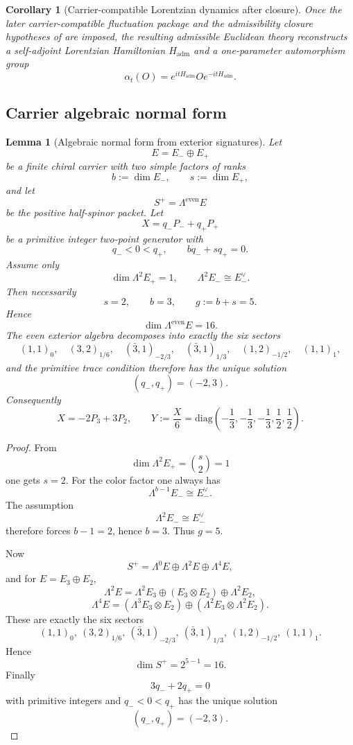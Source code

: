 \documentclass[11pt,a4paper]{article}
\newtheorem{corollary}[theorem]{Corollary}
\newtheorem{lemma}[theorem]{Lemma}
\theoremstyle{definition}
\theoremstyle{remark}
\begin{document}
\begin{corollary}[Carrier-compatible Lorentzian dynamics after closure]
Once the later carrier-compatible fluctuation package and the admissibility closure hypotheses of  are imposed, the resulting admissible Euclidean theory reconstructs a self-adjoint Lorentzian Hamiltonian $H_{\mathrm{adm}}$ and a one-parameter automorphism group
\[
\alpha_t(O)=e^{itH_{\mathrm{adm}}}Oe^{-itH_{\mathrm{adm}}}.
\]
\end{corollary}

\subsection{Carrier algebraic normal form}
\label{sec:minimal-carrier-proof}

\begin{lemma}[Algebraic normal form from exterior signatures]
\label{thm:carrier-minimality-k}
\label{thm:carrier-minimality-kpp}
Let
\[
E=E_-\oplus E_+
\]
be a finite chiral carrier with two simple factors of ranks
\[
b:=\dim E_-,
\qquad
s:=\dim E_+,
\]
and let
\[
S^+=\Lambda^{\mathrm{even}}E
\]
be the positive half-spinor packet. Let
\[
X=q_-P_-+q_+P_+
\]
be a primitive integer two-point generator with
\[
q_-<0<q_+,
\qquad
bq_-+sq_+=0.
\]
Assume only
\[
\dim \Lambda^2 E_+=1,
\qquad
\Lambda^2 E_- \cong E_-^\vee.
\]
Then necessarily
\[
s=2,
\qquad
b=3,
\qquad
g:=b+s=5.
\]
Hence
\[
\dim \Lambda^{\mathrm{even}}E=16.
\]
The even exterior algebra decomposes into exactly the six sectors
\[
(1,1)_0,\quad
(3,2)_{1/6},\quad
(\bar 3,1)_{-2/3},\quad
(\bar 3,1)_{1/3},\quad
(1,2)_{-1/2},\quad
(1,1)_1,
\]
and the primitive trace condition therefore has the unique solution
\[
(q_-,q_+)=(-2,3).
\]
Consequently
\[
X=-2P_3+3P_2,
\qquad
Y:=\frac{X}{6}
=
\mathrm{diag}\!\left(-\frac13,-\frac13,-\frac13,\frac12,\frac12\right).
\]
\end{lemma}

\begin{proof}
From
\[
\dim\Lambda^2 E_+=\binom{s}{2}=1
\]
one gets $s=2$. For the color factor one always has
\[
\Lambda^{b-1}E_- \cong E_-^\vee.
\]
The assumption
\[
\Lambda^2E_- \cong E_-^\vee
\]
therefore forces $b-1=2$, hence $b=3$. Thus $g=5$.

Now
\[
S^+=\Lambda^0E\oplus\Lambda^2E\oplus\Lambda^4E,
\]
and for $E=E_3\oplus E_2$,
\[
\Lambda^2E
=
\Lambda^2E_3
\oplus
(E_3\otimes E_2)
\oplus
\Lambda^2E_2,
\]
\[
\Lambda^4E
=
(\Lambda^3E_3\otimes E_2)
\oplus
(\Lambda^2E_3\otimes \Lambda^2E_2).
\]
These are exactly the six sectors
\[
(1,1)_0,\ (3,2)_{1/6},\ (\bar 3,1)_{-2/3},\ (\bar 3,1)_{1/3},\ (1,2)_{-1/2},\ (1,1)_1.
\]
Hence
\[
\dim S^+=2^{5-1}=16.
\]
Finally
\[
3q_-+2q_+=0
\]
with primitive integers and $q_-<0<q_+$ has the unique solution
\[
(q_-,q_+)=(-2,3).
\]
\end{proof}
\end{document}
